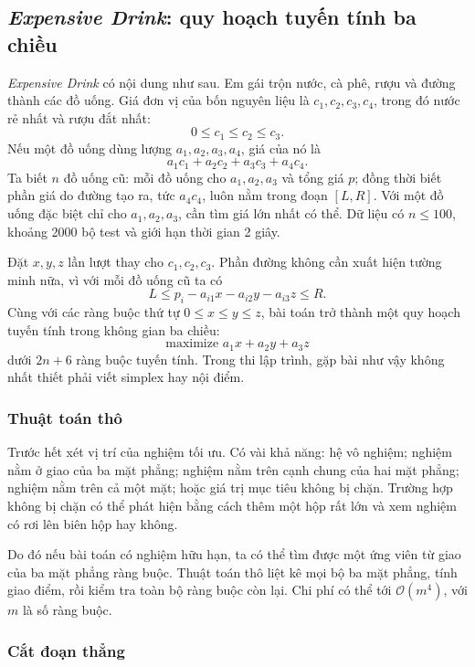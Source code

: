 \documentclass[11pt]{article}
\newcommand{\Oh}{\mathcal{O}}
\begin{document}
\subsection{\textit{Expensive Drink}: quy hoạch tuyến tính ba chiều}

\textit{Expensive Drink} có nội dung như sau. Em gái trộn nước, cà phê, rượu
và đường thành các đồ uống. Giá đơn vị của bốn nguyên liệu là
\(c_1,c_2,c_3,c_4\), trong đó nước rẻ nhất và rượu đắt nhất:
\[
  0\le c_1\le c_2\le c_3.
\]
Nếu một đồ uống dùng lượng \(a_1,a_2,a_3,a_4\), giá của nó là
\[
  a_1c_1+a_2c_2+a_3c_3+a_4c_4.
\]
Ta biết \(n\) đồ uống cũ: mỗi đồ uống cho \(a_1,a_2,a_3\) và tổng giá \(p\);
đồng thời biết phần giá do đường tạo ra, tức \(a_4c_4\), luôn nằm trong đoạn
\([L,R]\). Với một đồ uống đặc biệt chỉ cho \(a_1,a_2,a_3\), cần tìm giá lớn
nhất có thể. Dữ liệu có \(n\le 100\), khoảng 2000 bộ test và giới hạn thời
gian 2 giây.

Đặt \(x,y,z\) lần lượt thay cho \(c_1,c_2,c_3\). Phần đường không cần xuất
hiện tường minh nữa, vì với mỗi đồ uống cũ ta có
\[
  L \le p_i-a_{i1}x-a_{i2}y-a_{i3}z \le R.
\]
Cùng với các ràng buộc thứ tự \(0\le x\le y\le z\), bài toán trở thành một
quy hoạch tuyến tính trong không gian ba chiều:
\[
  \text{maximize } a_1x+a_2y+a_3z
\]
dưới \(2n+6\) ràng buộc tuyến tính. Trong thi lập trình, gặp bài như vậy không
nhất thiết phải viết simplex hay nội điểm.

\subsubsection{Thuật toán thô}

Trước hết xét vị trí của nghiệm tối ưu. Có vài khả năng: hệ vô nghiệm; nghiệm
nằm ở giao của ba mặt phẳng; nghiệm nằm trên cạnh chung của hai mặt phẳng;
nghiệm nằm trên cả một mặt; hoặc giá trị mục tiêu không bị chặn. Trường hợp
không bị chặn có thể phát hiện bằng cách thêm một hộp rất lớn và xem nghiệm
có rơi lên biên hộp hay không.

Do đó nếu bài toán có nghiệm hữu hạn, ta có thể tìm được một ứng viên từ giao
của ba mặt phẳng ràng buộc. Thuật toán thô liệt kê mọi bộ ba mặt phẳng, tính
giao điểm, rồi kiểm tra toàn bộ ràng buộc còn lại. Chi phí có thể tới
\(\Oh(m^4)\), với \(m\) là số ràng buộc.

\subsubsection{Cắt đoạn thẳng}
\end{document}

